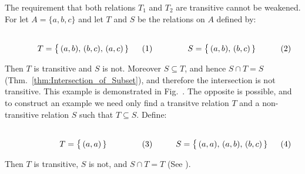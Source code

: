     \begin{example}
        The requirement that both relations $T_{1}$ and $T_{2}$ are transitive
        cannot be weakened. For let $A=\{a,b,c\}$ and let $T$ and $S$ be the
        relations on $A$ defined by:
        \par\hfill\par
        \begin{subequations}
            \begin{minipage}[b]{0.49\textwidth}
                \centering
                \begin{equation}
                    T=\big\{\,(a,b),\,(b,c),\,(a,c)\,\}
                \end{equation}
            \end{minipage}
            \hfill
            \begin{minipage}[b]{0.49\textwidth}
                \centering
                \begin{equation}
                    S=\big\{\,(a,b),\,(b,c)\,\}
                \end{equation}
            \end{minipage}
        \end{subequations}
        \par\vspace{2.5ex}
        Then $T$ is transitive and $S$ is not. Moreover $S\subseteq{T}$, and
        hence $S\cap{T}=S$ (Thm.~\ref{thm:Intersection_of_Subset}), and
        therefore the intersection is not transitive. This example is
        demonstrated in
        Fig.~. The
        opposite is possible, and to construct an example we need only find a
        transitve relation $T$ and a non-transitive relation $S$ such that
        $T\subseteq{S}$. Define:
        \par\hfill\par
        \begin{subequations}
            \begin{minipage}[b]{0.49\textwidth}
                \centering
                \begin{equation}
                    T=\big\{\,(a,a)\,\}
                \end{equation}
            \end{minipage}
            \hfill
            \begin{minipage}[b]{0.49\textwidth}
                \centering
                \begin{equation}
                    S=\big\{\,(a,a),\,(a,b),\,(b,c)\,\}
                \end{equation}
            \end{minipage}
        \end{subequations}
        \par\vspace{2.5ex}
        Then $T$ is transitive, $S$ is not, and $S\cap{T}=T$
        (See ).
    \end{example}

